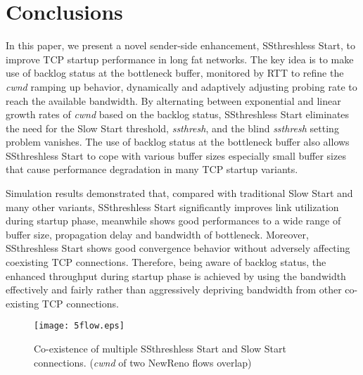 \documentclass[12pt,onecolumn]{IEEEtran}
\begin{document}
\section{Conclusions}

In this paper, we present a novel sender-side enhancement, SSthreshless
Start, to improve TCP startup performance in long fat networks. The key idea is
to make use of backlog status at the bottleneck buffer, monitored by RTT to
refine the \emph{cwnd} ramping up behavior, dynamically and adaptively
adjusting probing rate to reach the available bandwidth. By alternating between
exponential and linear growth rates of \emph{cwnd} based on the backlog status,
SSthreshless Start eliminates the need for the Slow Start threshold,
\emph{ssthresh}, and the blind \emph{ssthresh} setting problem vanishes. The
use of backlog status at the bottleneck buffer also allows SSthreshless Start
to cope with various buffer sizes especially small buffer sizes that cause
performance degradation in many TCP startup variants.

Simulation results demonstrated that, compared with traditional Slow Start and
many other variants, SSthreshless Start significantly improves link utilization
during startup phase, meanwhile shows good performances to a wide range of
buffer size, propagation delay and bandwidth of bottleneck. Moreover, SSthreshless
Start shows good convergence behavior without adversely affecting coexisting
TCP connections. Therefore, being aware of backlog status, the enhanced throughput during startup phase is
achieved by using the bandwidth effectively and fairly rather than aggressively
depriving bandwidth from other co-existing TCP connections.

\begin{figure}
\centering
\texttt{[image: 5flow.eps]}
\caption{Co-existence of multiple SSthreshless Start and Slow Start
connections. (\emph{cwnd} of two NewReno flows overlap)} \label{fig_five-flow}
\end{figure}
\end{document}
